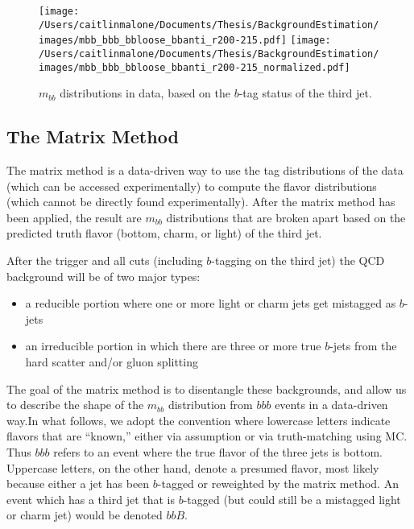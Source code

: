 \begin{figure}[hbt]
  \texttt{[image: /Users/caitlinmalone/Documents/Thesis/BackgroundEstimation/images/mbb\_bbb\_bbloose\_bbanti\_r200-215.pdf]}
  \texttt{[image: /Users/caitlinmalone/Documents/Thesis/BackgroundEstimation/images/mbb\_bbb\_bbloose\_bbanti\_r200-215\_normalized.pdf]}
  \label{fig:mbb_bbb_bbloose_bbanti_data}
  \caption{$m_{bb}$ distributions in data, based on the $b$-tag status of the third jet.}
\end{figure}


\subsection{The Matrix Method}
The matrix method is a data-driven way to use the tag distributions of the data (which can be accessed experimentally) to compute the flavor distributions (which cannot be directly found experimentally).  After the matrix method has been applied, the result are $m_{bb}$ distributions that are broken apart based on the predicted truth flavor (bottom, charm, or light) of the third jet.  

After the trigger and all cuts (including $b$-tagging on the third jet) the QCD background will be of two major types:

\begin{itemize}
    \item a reducible portion where one or more light or charm jets get mistagged as $b$-jets
    \item an irreducible portion in which there are three or more true $b$-jets from the
hard scatter and/or gluon splitting
\end{itemize}


The goal of the matrix method is to disentangle these backgrounds, and allow us to describe the shape of the $m_{bb}$ distribution from $bbb$ events
in a data-driven way.In what follows, we adopt the convention where lowercase letters indicate flavors
that are ``known,'' either via assumption or via truth-matching using MC.  Thus $bbb$ refers to an event where the true flavor of the three jets is bottom.  Uppercase letters,
on the other hand, denote a presumed flavor, most likely because either a jet has been $b$-tagged or reweighted by the matrix method.  An event which has a third jet
that is $b$-tagged (but could still be a mistagged light or charm jet) would be
denoted $bbB$.  

